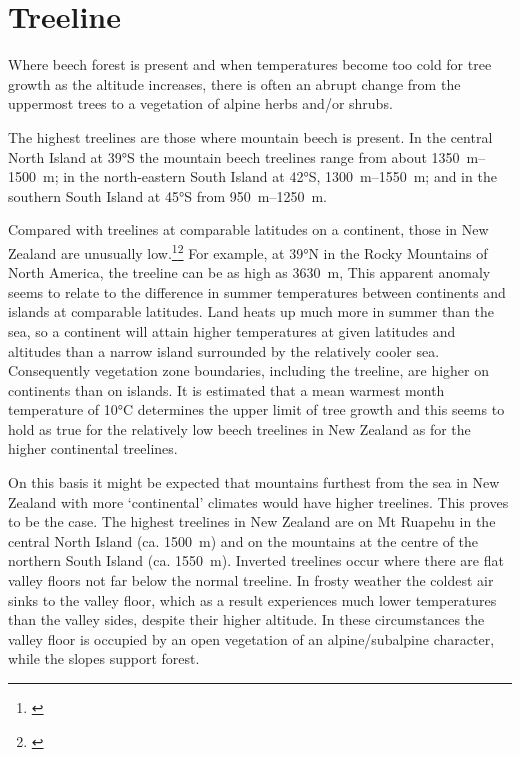 \section{Treeline}

Where beech forest is present and when temperatures become too cold for tree growth as the altitude increases, there is often an abrupt change from the uppermost trees to a vegetation of alpine herbs and/or shrubs.

The highest treelines are those where mountain beech is present.
In the central North Island at \ang{39}S the mountain beech treelines range from about \SIrange{1350}{1500}{\metre}; in the north-eastern South Island at \ang{42}S, \SIrange{1300}{1550}{\metre}; and in the southern South Island at \ang{45}S from \SIrange{950}{1250}{\metre}.

Compared with treelines at comparable latitudes on a continent, those in New Zealand are unusually low.\footnote{\cite{wardle1965comparison}}\footnote{\cite{wardle1971explanation}} For example, at \ang{39}N in the Rocky Mountains of North America, the treeline can be as high as \SI{3630}{\metre}, This apparent anomaly seems to relate to the difference in summer temperatures between continents and islands at comparable latitudes.
Land heats up much more in summer than the sea, so a continent will attain higher temperatures at given latitudes and altitudes than a narrow island surrounded by the relatively cooler sea.
Consequently vegetation zone boundaries, including the treeline, are higher on continents than on islands.
It is estimated that a mean warmest month temperature of \ang{10}C determines the upper limit of tree growth and this seems to hold as true for the relatively low beech treelines in New Zealand as for the higher continental treelines.

On this basis it might be expected that mountains furthest from the sea in New Zealand with more `continental' climates would have higher treelines.
This proves to be the case.
The highest treelines in New Zealand are on Mt Ruapehu in the central North Island (ca. \SI{1500}{\metre}) and on the mountains at the centre of the northern South Island (ca. \SI{1550}{\metre}).
Inverted treelines occur where there are flat valley floors not far below the normal treeline.
In frosty weather the coldest air sinks to the valley floor, which as a result experiences much lower temperatures than the valley sides, despite their higher altitude.
In these circumstances the valley floor is occupied by an open vegetation of an alpine/subalpine character, while the slopes support forest.

